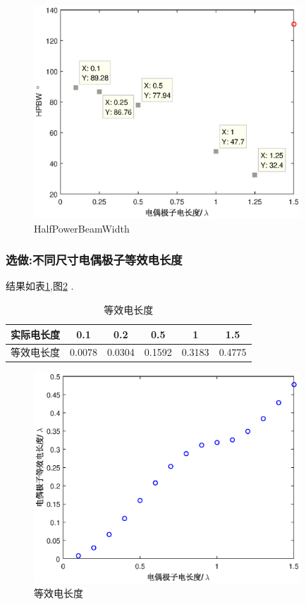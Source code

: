 \begin{figure}[!ht]
\centering
\includegraphics[width=10cm]{Dipole_3dB_beamwidth.eps}
\caption{HalfPowerBeamWidth} \label{fig:DP3dB}
\end{figure}
\subsubsection{选做:不同尺寸电偶极子等效电长度}
结果如表\ref{tab:EQ_L},图\ref{fig:DP_EQ_L} .
\\
\begin{table}[!ht]
\centering
\begin{tabular}{cccccc}
\toprule
实际电长度&0.1 &0.2&0.5&1&1.5\\
\midrule
等效电长度&0.0078&0.0304&0.1592&0.3183&0.4775\\
\bottomrule
\end{tabular}
\caption{等效电长度} \label{tab:EQ_L}
\end{table}


\begin{figure}[!ht]
\centering
\includegraphics[width=10cm]{Dipole_Eq_length.eps}
\caption{等效电长度} \label{fig:DP_EQ_L}
\end{figure}
